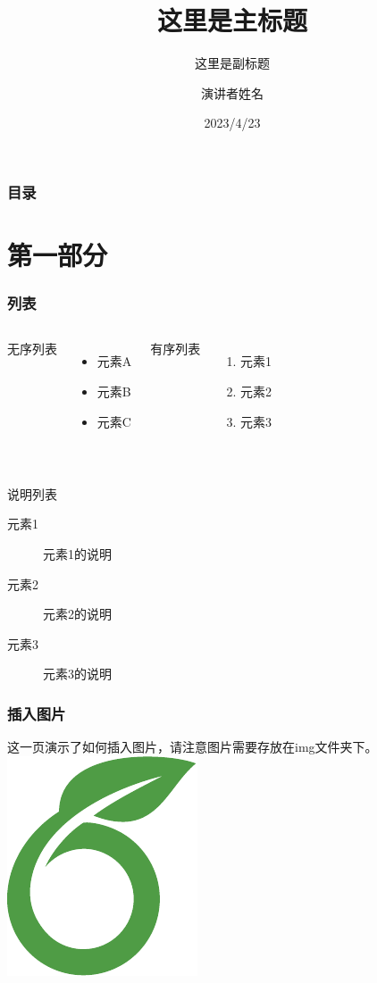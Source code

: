 \documentclass{beamer}
\title[beamer中文模板]{这里是主标题}
\subtitle{这里是副标题}
\author{演讲者姓名}
\institute{机构名称}
\date{2023/4/23}
\begin{document}
\frame{\titlepage}

\begin{frame}
\frametitle{目录}
\tableofcontents
\end{frame}

\section{第一部分}

\begin{frame}
\frametitle{列表}

\begin{columns}[T,onlytextwidth]
    无序列表
    \begin{itemize}
    \item 元素A 
    \item 元素B
    \item 元素C
    \end{itemize}

    有序列表
    \begin{enumerate}
    \item 元素1
    \item 元素2
    \item 元素3
    \end{enumerate}
\end{columns}

\hspace*{\fill}\\
说明列表
\begin{description}
\item[元素1] 元素1的说明
\item[元素2] 元素2的说明
\item[元素3] 元素3的说明
\end{description}

\end{frame}

\begin{frame}
\frametitle{插入图片}
这一页演示了如何插入图片，请注意图片需要存放在img文件夹下。\\
\includegraphics{overleaf-logo}
\centering
\end{frame}
\end{document}
